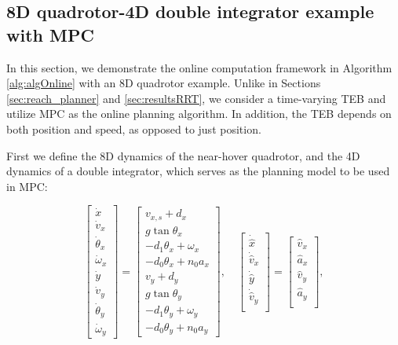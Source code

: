 \subsection{8D quadrotor-4D double integrator example with MPC \label{sec:resultsMPC}}

In this section, we demonstrate the online computation framework in Algorithm \ref{alg:algOnline} with an 8D quadrotor example. 
Unlike in Sections \ref{sec:reach_planner} and \ref{sec:resultsRRT}, we consider a time-varying TEB and utilize MPC as the online planning algorithm.
In addition, the TEB depends on both position and speed, as opposed to just position. 

First we define the 8D dynamics of the near-hover quadrotor, and the 4D dynamics of a double integrator, which serves as the planning model to be used in MPC:

\begin{equation}
\label{eq:Quad8D_dyn}
\begin{bmatrix}
\dot x\\
\dot v_x\\
\dot \theta_x\\
\dot \omega_x\\
\dot y\\
\dot v_y\\
\dot \theta_y\\
\dot \omega_y
\end{bmatrix} =
\begin{bmatrix}
v_{x,s} + d_x\\
g \tan \theta_x\\
-d_1 \theta_x + \omega_x\\
-d_0 \theta_x + n_0 a_x\\
v_y + d_y\\
g \tan \theta_y\\
-d_1 \theta_y + \omega_y\\
-d_0 \theta_y + n_0 a_y
\end{bmatrix}, \quad
\begin{bmatrix}
\dot {\hat x}\\
\dot {\hat v}_x\\
\dot {\hat y}\\
\dot {\hat v}_y\\
\end{bmatrix} =
\begin{bmatrix}
\hat v_x\\
\hat a_x\\
\hat v_y\\
\hat a_y\\
\end{bmatrix},
\end{equation}

